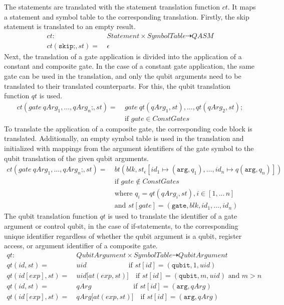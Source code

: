 The statements are translated with the statement translation function $ct$. It maps a statement and symbol table to the corresponding translation. Firstly, the skip statement is translated to an empty result.
\begin{align*}
    ct : \ & Statement \times SymbolTable \dashrightarrow QASM\\
    ct(\texttt{skip;}, st) = \ & \epsilon
\end{align*}
Next, the translation of a gate application is divided into the application of a constant and composite gate. In the case of a constant gate application, the same gate can be used in the translation, and only the qubit arguments need to be translated to their translated counterparts. For this, the qubit translation function $qt$ is used.
\begin{align*}
    ct(gate \ qArg_1, \dots, qArg_n\texttt{;}, st) = \ & gate \ qt(qArg_1, st), \dots, qt(qArg_2, st); \\
                                                       & \text{if } gate \in ConstGates
\end{align*}
To translate the application of a composite gate, the corresponding code block is translated. Additionally, an empty symbol table is used in the translation and initialized with mappings from the argument identifiers of the gate symbol to the qubit translation of the given qubit arguments.
\begin{align*}
    ct(gate \ qArg_1, \dots, qArg_n\texttt{;}, st) = \ & bt(blk, st_\epsilon[id_1 \mapsto (\texttt{arg}, q_1), \dots, id_n \mapsto q(\texttt{arg}, q_n)]) \\
        &\text{if } gate \not\in ConstGates\\
        &\text{where } q_i = qt(qArg_i, st), i \in [1, ...\, n]\\
        &\text{and } st[gate] = (\texttt{gate}, blk, id_1, \dots, id_n)
\end{align*}
The qubit translation function $qt$ is used to translate the identifier of a gate argument or control qubit, in the case of if-statements, to the corresponding unique identifier regardless of whether the qubit argument is a qubit, register access, or argument identifier of a composite gate.
\begin{align*}
    qt :\ & \displaystyle QubitArgument \times SymbolTable \dashrightarrow QubitArgument\\
    qt(id, st) = \ & uid \quad\quad\quad\quad\quad\quad \text{if } st[id] = (\texttt{qubit}, 1, uid)\\
    qt(id[exp], st) = \ & uid\texttt{[}at(exp, st)\texttt{]} \quad \text{if } st[id] = (\texttt{qubit}, m, uid) \text{ and } m > n\\
    qt(id, st) = \ & qArg \quad\quad\quad\quad\quad\quad \text{if } st[id] = (\texttt{arg}, qArg)\\
    qt(id[exp], st) = \ & qArg\texttt{[}at(exp, st)\texttt{]} \quad \text{if } st[id] = (\texttt{arg}, qArg)
\end{align*}

